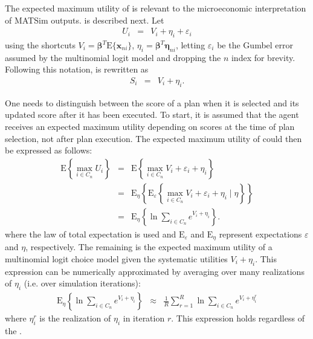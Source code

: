The expected maximum utility of  is 
relevant to the 
{microeconomic interpretation of MATSim outputs}.
 is described next. 
%
Let
\begin{eqnarray}
U_{i} & = & V_{i}+\eta_{i}+\varepsilon_{i}\label{eq:full-random-utility-without-time}
\end{eqnarray}
using the shortcuts $V_{i}=\boldsymbol{\beta}^{T}\text{E}\{\mathbf{x}_{ni}\}$,
$\eta_{i}=\boldsymbol{\beta}^{T}\boldsymbol{\eta}_{ni}$, letting
$\varepsilon_{i}$ be the Gumbel error assumed by the multinomial
logit model and dropping the $n$ index for brevity. Following this
notation,  is rewritten as
\begin{eqnarray}
S_{i} & = & V_{i}+\eta_{i}.\label{eq:score-shorthand}
\end{eqnarray}

One needs to distinguish between the score of a plan when
it is selected and its updated score after it has been executed.
To start, it is assumed that the agent receives an expected maximum 
utility depending on  scores at the time of plan selection,
not after plan execution. The expected maximum utility of
 could then be expressed as follows:
\begin{eqnarray}
\text{E}\left\{\max_{i\in C_n}U_{i}\right\} & = &
\text{E}\left\{\max_{i\in C_n}V_{i}+\varepsilon_{i}+\eta_{i}\right\}\\
 & = & \text{E}_{\eta}\left\{\text{E}_{\varepsilon}\left\{\max_{i\in
 C_n}V_{i}+\varepsilon_{i}+\eta_{i}\mid\eta\right\}\right\}\\
 & = & \text{E}_{\eta}\left\{ \ln\sum_{i\in C_n}e^{V_{i}+\eta_{i}}\right\} .
\end{eqnarray}
where the law of total expectation is used and $\text{E}_{\varepsilon}$
and $\text{E}_{\eta}$ represent expectations 
$\varepsilon$ and $\eta$, respectively. 
The remaining
 is the expected maximum
utility of a multinomial logit choice model\corr{,}{} given the systematic
utilities $V_{i}+\eta_{i}$. This expression can be numerically approximated by averaging over many
realizations of $\eta_i$ (i.e. over simulation iterations):
\begin{eqnarray}
\text{E}_{\eta}\left\{ \ln\sum_{i\in C_n}e^{V_{i}+\eta_{i}}\right\}  & \approx & 
\frac{1}{R}\sum_{r=1}^{R}\ln\sum_{i\in
C_n}e^{V_{i}+\eta_{i}^{r}}\label{eq:wartezimmer}
\end{eqnarray}
where $\eta_i^r$ is the realization of $\eta_i$ in iteration $r$.
This expression holds\corr{,}{} regardless of the .

